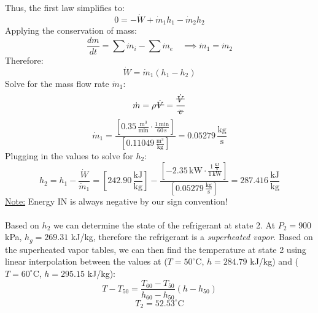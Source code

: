 \documentclass[12pt]{article}
\newcommand{\vol}{\mathord{\text{\ooalign{\hidewidth $V$\hidewidth\cr\kern-0.5pt\raisebox{0.8ex}{\rule[0pt]{1em}{0.5pt}}}}}}
\newcommand{\svol}{%
  \mathord{\text{\ooalign{%
    \hfil$v$\hfil\cr
    \hfil\rule[0.6ex]{0.8em}{0.5pt}\hfil
  }}}%
}
\begin{document}
Thus, the first law simplifies to:
\[0 = -\dot{W} + \dot{m}_1h_1 - \dot{m}_2h_2\]
Applying the conservation of mass:
\[\frac{dm}{dt} = \sum \dot{m}_i - \sum \dot{m}_e\quad \implies \dot{m}_1 = \dot{m}_2\]
Therefore:
\[\dot{W} = \dot{m}_1(h_1 - h_2)\]
Solve for the mass flow rate $\dot{m}_1$:
\[\dot{m} = \rho \dot{\vol} = \frac{\dot{\vol}}{\svol}\]
\[\dot{m}_1 = \frac{\left[0.35\,\frac{\text{m}^3}{\text{min}} \cdot \frac{1\,\text{min}}{60\,\text{s}}\right]}{\left[0.11049\,\frac{\text{m}^3}{\text{kg}}\right]} = 0.05279\,\frac{\text{kg}}{\text{s}}\]
Plugging in the values to solve for $h_2$:
\[h_2 = h_1 - \frac{\dot{W}}{\dot{m}_1} = \left[242.90\,\frac{\text{kJ}}{\text{kg}}\right] - \frac{\left[-2.35\,\text{kW}\cdot \frac{1\,\frac{\text{kJ}}{\text{s}}}{1\,\text{kW}}\right]}{\left[0.05279\,\frac{\text{kg}}{\text{s}}\right]}=287.416\,\frac{\text{kJ}}{\text{kg}}\]
\underline{Note:} Energy IN is always negative by our sign convention!\\\\
Based on $h_2$ we can determine the state of the refrigerant at state 2. At $P_2=900$ kPa, $h_g = 269.31$ kJ/kg, therefore the refrigerant is a \textit{superheated vapor}. Based on the superheated vapor tables, we can then find the temperature at state 2 using linear interpolation between the values at ($T=50^\circ\text{C}$, $h= 284.79$ kJ/kg) and ($T=60^\circ\text{C}$, $h= 295.15$ kJ/kg):
\[T - T_{50} = \frac{T_{60} - T_{50}}{h_{60} - h_{50}} (h - h_{50})\]
\[\boxed{T_2 = 52.53^\circ\text{C}}\]
\newpage
\end{document}
